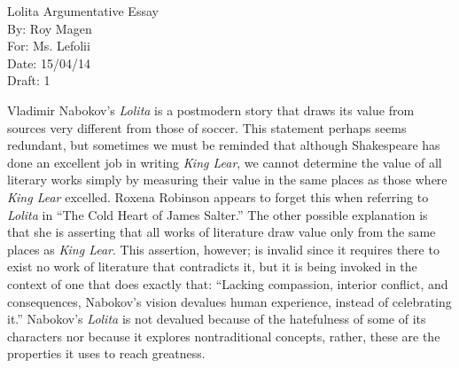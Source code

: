\documentclass[12pt]{article}
\begin{document}
\begin{titlepage}
  \noindent Lolita Argumentative Essay \\
  By: Roy Magen \\
  For: Ms. Lefolii \\
  Date: 15/04/14 \\
  Draft: 1
\end{titlepage}
\noindent Vladimir Nabokov's \textit{Lolita} is a postmodern story that draws its value from sources very different from those of soccer. This statement perhaps seems redundant, but sometimes we must be reminded that although Shakespeare has done an excellent job in writing \textit{King Lear}, we cannot determine the value of all literary works simply by measuring their value in the same places as those where \textit{King Lear} excelled. Roxena Robinson appears to forget this when referring to \textit{Lolita} in ``The Cold Heart of James Salter.'' The other possible explanation is that she is asserting that all works of literature draw value only from the same places as \textit{King Lear}. This assertion, however; is invalid since it requires there to exist no work of literature that contradicts it, but it is being invoked in the context of one that does exactly that: ``Lacking compassion, interior conflict, and consequences, Nabokov's vision devalues human experience, instead of celebrating it.'' Nabokov's \textit{Lolita} is not devalued because of the hatefulness of some of its characters nor because it explores nontraditional concepts, rather, these are the properties it uses to reach greatness.
\end{document}
